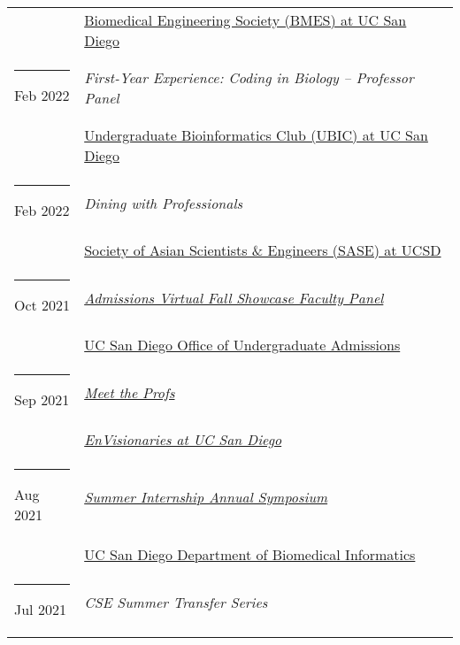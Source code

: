 \documentclass[margin,line]{res}
\begin{document}
\begin{resume}
\begin{longtable}{@{}p{0.7in}p{4in}}
\hspace*{-4mm} & \hspace{4mm} \href{http://bmes.ucsd.edu/}{Biomedical Engineering Society (BMES) at UC San Diego}\\
\hspace*{-4mm} \rule{-1mm}{5mm} Feb 2022 & \textit{First-Year Experience: Coding in Biology -- Professor Panel}\\*
\hspace*{-4mm} & \hspace{4mm} \href{https://ubicucsd.github.io/}{Undergraduate Bioinformatics Club (UBIC) at UC San Diego}\\
\hspace*{-4mm} \rule{-1mm}{5mm} Feb 2022 & \textit{Dining with Professionals}\\*
\hspace*{-4mm} & \hspace{4mm} \href{https://saseatucsd.weebly.com/}{Society of Asian Scientists \& Engineers (SASE) at UCSD}\\
\hspace*{-4mm} \rule{-1mm}{5mm} Oct 2021 & \href{https://beatriton.ucsd.edu/register/ucsdvirtualfallshowcase}{\textit{Admissions Virtual Fall Showcase Faculty Panel}}\\*
\hspace*{-4mm} & \hspace{4mm} \href{https://admissions.ucsd.edu/}{UC San Diego Office of Undergraduate Admissions}\\
\hspace*{-4mm} \rule{-1mm}{5mm} Sep 2021 & \href{https://www.facebook.com/events/610194613335437}{\textit{Meet the Profs}}\\*
\hspace*{-4mm} & \hspace{4mm} \href{https://www.facebook.com/envisionariesUCSD/}{\textit{EnVisionaries at UC San Diego}}\\
\hspace*{-4mm} \rule{-1mm}{5mm} Aug 2021 & \href{https://dbmi.ucsd.edu/education/internships/index.html}{\textit{Summer Internship Annual Symposium}}\\*
\hspace*{-4mm} & \hspace{4mm} \href{https://dbmi.ucsd.edu/}{UC San Diego Department of Biomedical Informatics}\\
\hspace*{-4mm} \rule{-1mm}{5mm} Jul 2021 & \textit{CSE Summer Transfer Series}\\*

\end{longtable}
\end{resume}
\end{document}
